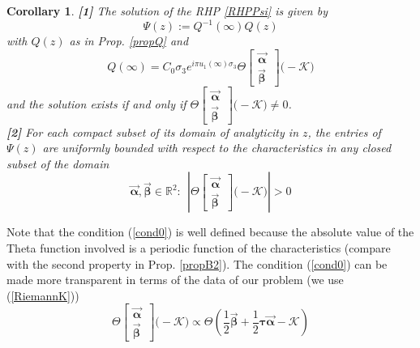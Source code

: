 \documentclass[10pt,oneside,reqno]{amsart}
\numberwithin{equation}{section}
\newtheorem{corollary}[theorem]{Corollary}
\def\le{\left}
\def\ri{\right}
\def\bc{\begin{corollary}}
\def\ec{\end{corollary}}
\def\be{\begin{equation}}
\def\ee{\end{equation}}
\def\R{{\mathbb R}}
\def\eqref#1{(\ref{#1})}
\begin{document}
%
\bc
\label{solPsi}
{\bf [1]} The solution of the RHP \ref{RHPPsi} is given by 
\be
\Psi(z) := Q^{-1}(\infty) Q(z)
\ee
with $Q(z)$ as in Prop. \ref{propQ} and 
\be
Q(\infty) =              C_0\sigma_3e^{i\pi u_1(\infty)\sigma_3}\Theta\begin{bmatrix}
         \vec{\boldsymbol \alpha}\,\\
\vec{\boldsymbol \beta}\,
        \end{bmatrix}\big(-\mathcal{K}\big)
\ee
and the solution exists if and only if $\Theta\begin{bmatrix}
         \vec{\boldsymbol \alpha}\,\\
\vec{\boldsymbol \beta}\,
        \end{bmatrix}\big(-\mathcal{K}\big)\neq 0$.\\
{\bf [2]} For each compact subset of its domain of analyticity in $z$, the entries of $\Psi(z)$ are uniformly bounded with respect to the characteristics  in any closed subset of the domain 
 \be
 \vec{\boldsymbol \alpha}, \vec {\boldsymbol \beta} \in \R^2:  \ \ \le| \Theta\begin{bmatrix}
         \vec{\boldsymbol \alpha}\,\\
\vec{\boldsymbol \beta}\,
        \end{bmatrix}\big(-\mathcal{K}\big) \ri| > 0
        \label{cond0}
 \ee 
\ec
Note that the condition \eqref{cond0} is well defined because the absolute value of the Theta function involved is a periodic function of the characteristics (compare with the second property in Prop. \ref{propB2}).
%
%
The condition \eqref{cond0} can be made more transparent in terms of the data of our problem 
(we use  \eqref{RiemannK})
\begin{equation*}
  \Theta\begin{bmatrix}
         \vec{\boldsymbol \alpha}\,\\
\vec{\boldsymbol \beta}\,
        \end{bmatrix}\big(-\mathcal{K}\big)\propto \Theta\left(\frac{1}{2}\vec{\boldsymbol \beta}+\frac{1}{2}{\boldsymbol \tau}\vec{\boldsymbol \alpha}-\mathcal{K}\right) 
\end{equation*}
\end{document}
